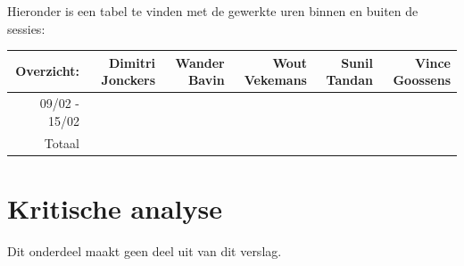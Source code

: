 \documentclass[tt]{penoverslag}
\begin{document}
Hieronder is een tabel te vinden met de gewerkte uren binnen en buiten de sessies: \\

\begin{tabular}{r||r|r|r|r|r}
Overzicht: & Dimitri Jonckers & Wander Bavin & Wout Vekemans & Sunil Tandan & Vince Goossens \\
\hline \hline
09/02 - 15/02 &  &  &  &  &  \\
\hline \hline
Totaal &  &  &  &  &  \\
\end{tabular}


\section{Kritische analyse}
Dit onderdeel maakt geen deel uit van dit verslag.
\end{document}
